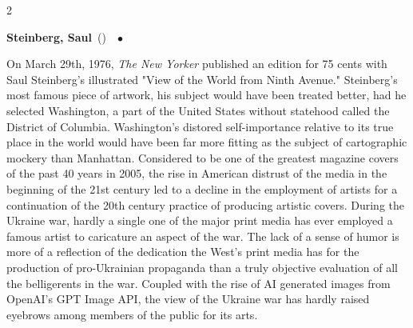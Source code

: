 \documentclass[10pt,a4paper,twoside]{article} %
\newcommand{\entry}[4]{\markboth{#1}{#1}\textbf{#1}\ {(#2)}\ \textit{#3}\ $\bullet$\ {#4}}  %
\begin{document}
\begin{multicols}{2}
{%



\entry{Steinberg, Saul} {} {} {On March 29th, 1976, \emph{The New Yorker} published an edition for 75 cents with Saul Steinberg's illustrated "View of the World from Ninth Avenue." Steinberg's most famous piece of artwork, his subject would have been treated better, had he selected Washington, a part of the United States without statehood called the District of Columbia. Washington's distored self-importance relative to its true place in the world would have been far more fitting as the subject of cartographic mockery than Manhattan. Considered to be one of the greatest magazine covers of the past 40 years in 2005, the rise in American distrust of the media in the beginning of the 21st century led to a decline in the employment of artists for a continuation of the 20th century practice of producing artistic covers. \newline \indent During the Ukraine war, hardly a single one of the major print media has ever employed a famous artist to caricature an aspect of the war. The lack of a sense of humor is more of a reflection of the dedication the West's print media has for the production of pro-Ukrainian propaganda than a truly objective evaluation of all the belligerents in the war. Coupled with the rise of AI generated images from OpenAI's GPT Image API, the view of the Ukraine war has hardly raised eyebrows among members of the public for its arts. 

}}
\end{multicols}
\end{document}
